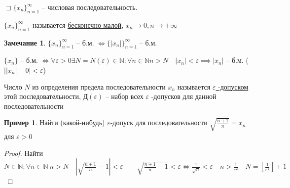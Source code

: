 \documentclass{book}
\newcommand\N{\ensuremath{\mathbb{N}}}
\theoremstyle{definition}
\newtheorem*{note}{Замечание}
\newtheorem*{example}{Пример}
\begin{document}
    \begin{definition}
        $\sqsupset \{x_n\}_{n=1}^{\infty }$ -- числовая последовательность. 

        $\{x_n\}_{n=1}^{\infty }$ называется \underline{бесконечно малой}, $x_{n} \to 0, n\to +\infty $
    \end{definition}
    
    \begin{note}
        $\{x_n\}_{n=1}^{\infty }$ -- б.м. $\iff \{\left| x_{n}  \right| \}_{n=1}^{\infty }$ -- б.м.

        $\{x_n\}$ -- б.м. $\iff  \forall \varepsilon>0 \exists N = N(\varepsilon)\in \N: \forall n\in \N  n>N\quad \left| x_n \right| <\varepsilon \implies \left| x_n \right|  $ -- б.м. ($\left| \left| x_{n}  \right| -0 \right| <\varepsilon$)
    \end{note}

    \begin{definition}
        Число $N$ из определения предела последовательности $x_{n} $ называется \underline{$\varepsilon$ -допуском} этой последовательности, Д$\left( \varepsilon \right) $ -- набор всех $\varepsilon$ -допусков для данной последовательности
    \end{definition}

    \begin{example}
        Найти (какой-нибудь) $\varepsilon$-допуск для последовательности $\sqrt{\frac{n+1}{n}} = x_{n}  $ для $\varepsilon>0$
    \end{example}
    \begin{proof}
        Найти $N\in \N :\forall n\in \N ~n>N\quad \left| \sqrt{\frac{n+1}{n}} -1 \right| <\varepsilon\qquad \sqrt{\frac{n+1}{n}-1} <\varepsilon \iff  \frac{1}{\sqrt{n} }<\varepsilon\quad n>\frac{1}{\varepsilon^2}\quad N = \left\lfloor \frac{1}{\varepsilon^2} \right\rfloor +1$
    \end{proof}
\end{document}
